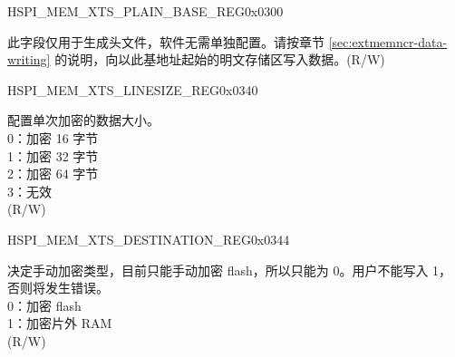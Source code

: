 
\begin{register}{H}{SPI\_MEM\_XTS\_PLAIN\_BASE\_REG}{0x0300}\label{regdesc:SPIMEMXTSPLAINBASEREG}
%
\regnewline%
\begin{regdesc}\begin{reglist}
\label{fielddesc:SPIMEMXTSPLAIN}\item [SPI\_MEM\_XTS\_PLAIN] 此字段仅用于生成头文件，软件无需单独配置。请按章节 \ref{sec:extmemncr-data-writing} 的说明，向以此基地址起始的明文存储区写入数据。(R/W)
\end{reglist}\end{regdesc}
\end{register}



\begin{register}{H}{SPI\_MEM\_XTS\_LINESIZE\_REG}{0x0340}\label{regdesc:SPIMEMXTSLINESIZEREG}
%
%
\regnewline%
\begin{regdesc}\begin{reglist}
\label{fielddesc:SPIMEMXTSLINESIZE}\item [SPI\_MEM\_XTS\_LINESIZE] 配置单次加密的数据大小。\\
0：加密 16 字节\\
1：加密 32 字节\\
2：加密 64 字节\\
3：无效\\
(R/W)
\end{reglist}\end{regdesc}
\end{register}


\begin{register}{H}{SPI\_MEM\_XTS\_DESTINATION\_REG}{0x0344}\label{regdesc:SPIMEMXTSDESTINATIONREG}
%
%
\regnewline%
\begin{regdesc}\begin{reglist}
\label{fielddesc:SPIMEMXTSDESTINATION}\item [SPI\_MEM\_XTS\_DESTINATION] 决定手动加密类型，目前只能手动加密 flash，所以只能为 0。用户不能写入 1，否则将发生错误。\\
0：加密 flash\\
1：加密片外 RAM\\
(R/W)
\end{reglist}\end{regdesc}
\end{register}


